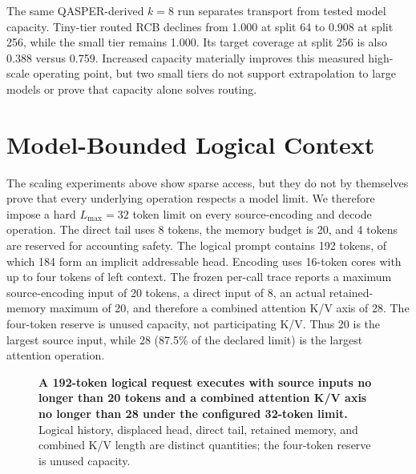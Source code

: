 \documentclass[11pt]{article}
\begin{document}
The same QASPER-derived $k=8$ run separates transport from tested model capacity. Tiny-tier
routed RCB declines from 1.000 at split 64 to 0.908 at split 256, while the small tier remains 1.000.
Its target coverage at split 256 is also 0.388 versus 0.759. Increased capacity materially improves
this measured high-scale operating point, but two small tiers do not support extrapolation to
large models or prove that capacity alone solves routing.

\section{Model-Bounded Logical Context}
\label{sec:bounded}

The scaling experiments above show sparse access, but they do not by themselves prove
that every underlying operation respects a model limit. We therefore impose a hard
$L_{\max}=32$ token limit on every source-encoding and decode operation. The direct tail
uses 8 tokens, the memory budget is 20, and 4 tokens are reserved for accounting safety.
The logical prompt contains 192 tokens, of which 184 form an implicit addressable head.
Encoding uses 16-token cores with up to four tokens of left context. The frozen per-call
trace reports a maximum source-encoding input of 20 tokens, a direct input of 8, an actual
retained-memory maximum of 20, and therefore a combined attention K/V axis of 28. The
four-token reserve is unused capacity, not participating K/V. Thus 20 is the largest source
input, while 28 (87.5\% of the declared limit) is the largest attention operation.

\begin{figure}[H]
\centering
{}
\caption{\textbf{A 192-token logical request executes with source inputs no longer than 20
tokens and a combined attention K/V axis no longer than 28 under the configured 32-token
limit.} Logical history, displaced head, direct tail, retained memory, and combined K/V
length are distinct quantities; the four-token reserve is unused capacity.}
\label{fig:bounded-head-path}
\end{figure}
\end{document}
